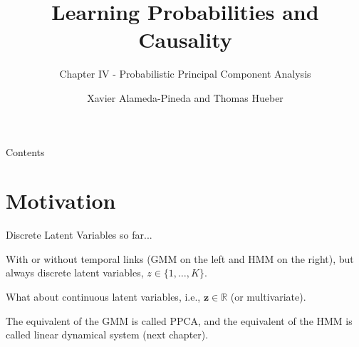\documentclass{beamer}
\title{Learning Probabilities and Causality}
\subtitle{Chapter IV - Probabilistic Principal Component Analysis} %
\author[Xavi and Thomas]{Xavier Alameda-Pineda and Thomas Hueber}
\institute{Ensimag/Inria/CNRS/Univ. Grenoble-Alpes}
\date{}
\newcommand{\bs}[1]{\boldsymbol{#1}}
\begin{document}
\begin{frame}
  \titlepage
\end{frame}

\begin{frame}{Contents}
 \tableofcontents
\end{frame}

\section{Motivation}

\begin{frame}{Discrete Latent Variables so far...}

With or without temporal links (GMM on the left and HMM on the right), but always discrete latent variables, $z\in\{1,\ldots,K\}$.
\begin{figure}
 \hspace{2cm}
\end{figure}

What about continuous latent variables, i.e., $\bs{z}\in\mathbb{R}$ (or multivariate).\vspace{\baselineskip}

The equivalent of the GMM is called PPCA, and the equivalent of the HMM is called linear dynamical system (next chapter).

\end{frame}
\end{document}
